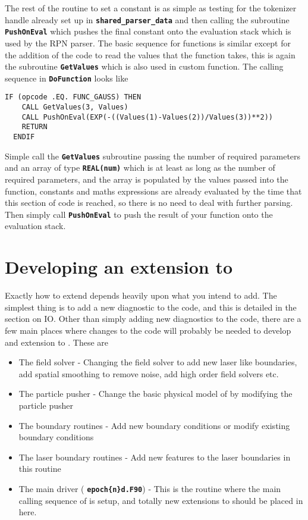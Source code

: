 \documentclass[12pt,a4paper]{article}
\newcommand{\simpleboxverbatim}{\begin{Verbatim}[obeytabs=true,frame=single,
  framerule=0.5mm,rulecolor=\color{warwickmid},formatcom=\color{black}]}
\newcommand{\inlinecode}[1]{{\color{warwickred} \bf\texttt{#1}}}
\newcommand{\EPOCH}{{\color{warwickdark}\fontfamily{phv}\selectfont{EPOCH}}}
\begin{document}
The rest of the routine to set a constant is as simple as testing for the
tokenizer handle already set up in \inlinecode{shared\_parser\_data} and then
calling the subroutine \inlinecode{PushOnEval} which pushes the final constant
onto the evaluation stack which is used by the RPN parser. The basic sequence
for functions is similar except for the addition of the code to read the values
that the function takes, this is again the subroutine \inlinecode{GetValues}
which is also used in custom function. The calling sequence in
\inlinecode{DoFunction} looks like

\simpleboxverbatim
  IF (opcode .EQ. FUNC_GAUSS) THEN
    CALL GetValues(3, Values)
    CALL PushOnEval(EXP(-((Values(1)-Values(2))/Values(3))**2))
    RETURN
  ENDIF
\end{Verbatim}
Simple call the \inlinecode{GetValues} subroutine passing the number of
required parameters and an array of type \inlinecode{REAL(num)} which is at
least as long as the number of required parameters, and the array is populated
by the values passed into the function, constants and maths expressions are
already evaluated by the time that this section of code is reached, so there is
no need to deal with further parsing. Then simply call \inlinecode{PushOnEval}
to push the result of your function onto the evaluation stack.

\section{Developing an extension to {\EPOCH}}

Exactly how to extend {\EPOCH} depends heavily upon what you intend to add. The
simplest thing is to add a new diagnostic to the code, and this is detailed in
the section on {\EPOCH} IO. Other than simply adding new diagnostics to the code,
there are a few main places where changes to the code will probably be needed
to develop and extension to \EPOCH. These are
\begin{itemize}
\item The field solver - Changing the field solver to add new laser like
  boundaries, add spatial smoothing to remove noise, add high order field
  solvers etc.
\item The particle pusher - Change the basic physical model of {\EPOCH} by
  modifying the particle pusher
\item The boundary routines - Add new boundary conditions or modify existing
  boundary conditions
\item The laser boundary routines - Add new features to the laser boundaries in
  this routine
\item The main driver (\inlinecode{epoch\{n\}d.F90}) - This is the routine
  where the main calling sequence of {\EPOCH} is setup, and totally new
  extensions to {\EPOCH} should be placed in here.
\end{itemize}
\end{document}
